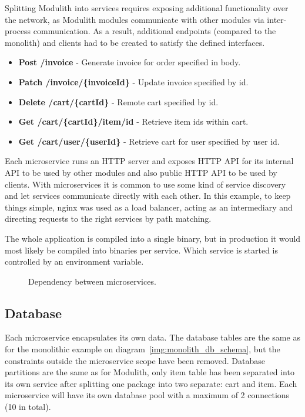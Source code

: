 Splitting Modulith into services requires exposing additional functionality over the network, as Modulith modules communicate with other modules via inter-process communication. As a result, additional endpoints (compared to the monolith) and clients had to be created to satisfy the defined interfaces.

\begin{itemize}
    \item \textbf{Post /invoice} - Generate invoice for order specified in body.
    \item \textbf{Patch /invoice/\{invoiceId\}} - Update invoice specified by id.
    \item \textbf{Delete /cart/\{cartId\}} - Remote cart specified by id.
    \item \textbf{Get /cart/\{cartId\}/item/id} - Retrieve item ids within cart.
    \item \textbf{Get /cart/user/\{userId\}} - Retrieve cart for user specified by user id.
\end{itemize}

Each microservice runs an HTTP server and exposes HTTP API for its internal API to be used by other modules and also public HTTP API to be used by clients. With microservices it is common to use some kind of service discovery and let services communicate directly with each other. In this example, to keep things simple, nginx was used as a load balancer, acting as an intermediary and directing requests to the right services by path matching.

The whole application is compiled into a single binary, but in production it would most likely be compiled into binaries per service. Which service is started is controlled by an environment variable.

\begin{figure}
    \centering
    
    \caption{Dependency between microservices. \label{img:microservices_dependency}}
\end{figure}

\subsection{Database}
Each microservice encapsulates its own data. The database tables are the same as for the monolithic example on diagram~\ref{img:monolith_db_schema}, but the constraints outside the microservice scope have been removed. Database partitions are the same as for Modulith, only item table has been separated into its own service after splitting one package into two separate: cart and item. Each microservice will have its own database pool with a maximum of 2 connections (10 in total).



